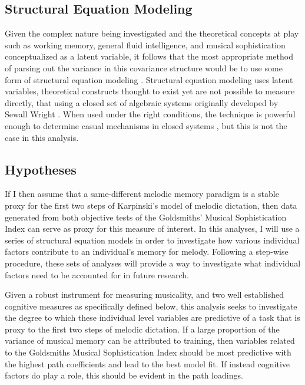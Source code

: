 \documentclass[]{book}
\begin{document}
\hypertarget{structural-equation-modeling}{%
\subsection{Structural Equation Modeling}\label{structural-equation-modeling}}

Given the complex nature being investigated and the theoretical concepts at play such as working memory, general fluid intelligence, and musical sophistication conceptualized as a latent variable, it follows that the most appropriate method of parsing out the variance in this covariance structure would be to use some form of structural equation modeling \citep{beaujeanLatentVariableModeling2014}.
Structural equation modeling uses latent variables, theoretical constructs thought to exist yet are not possible to measure directly, that using a closed set of algebraic systems originally developed by Sewall Wright \citep{wrightMethodPathCoefficents1934}.
When used under the right conditions, the technique is powerful enough to determine casual mechanisms in closed systems \citep{pearlBookWhyNew2018}, but this is not the case in this analysis.

\hypertarget{hypotheses}{%
\subsection{Hypotheses}\label{hypotheses}}

If I then assume that a same-different melodic memory paradigm is a stable proxy for the first two steps of Karpinski's model of melodic dictation, then data generated from both objective tests of the Goldsmiths' Musical Sophistication Index can serve as proxy for this measure of interest.
In this analyses, I will use a series of structural equation models in order to investigate how various individual factors contribute to an individual's memory for melody.
Following a step-wise procedure, these sets of analyses will provide a way to investigate what individual factors need to be accounted for in future research.

Given a robust instrument for measuring musicality, and two well established cognitive measures as specifically defined below, this analysis seeks to investigate the degree to which these individual level variables are predictive of a task that is proxy to the first two steps of melodic dictation.
If a large proportion of the variance of musical memory can be attributed to training, then variables related to the Goldsmiths Musical Sophistication Index should be most predictive with the highest path coefficients and lead to the best model fit.
If instead cognitive factors do play a role, this should be evident in the path loadings.
\end{document}
